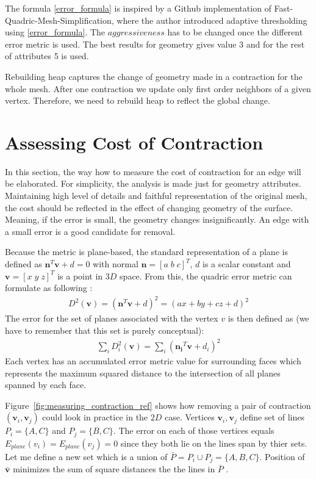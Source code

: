 The formula \ref{error_formula} is inspired by a Github implementation of Fast-Quadric-Mesh-Simplification, where the author introduced adaptive thresholding using \ref{error_formula}. The $aggressiveness$ has to be changed once the different error metric is used. The best results for geometry gives value 3 and for the rest of attributes 5 is used.

Rebuilding heap captures the change of geometry made in a contraction for the whole mesh. After one contraction we update only first order neighbors of a given vertex. Therefore, we need to rebuild heap to reflect the global change.

\section{Assessing Cost of Contraction}
In this section, the way how to measure the cost of contraction for an edge will be elaborated. For simplicity, the analysis is made just for geometry attributes. Maintaining high level of details and faithful representation of the original mesh, the cost should be reflected in the effect of changing geometry of the surface. Meaning, if the error is small, the geometry changes insignificantly. An edge with a small error is a good candidate for removal.

Because the metric is plane-based, the standard representation of a plane is defined as $\mathbf{n}^T\mathbf{v}+d=0$ with normal  $\mathbf{n} = [a\;b\;c]^T$, $d$ is a scalar constant and $\mathbf{v} = [x\;y\;z]^T$ is a point in $3D$ space. From this, the quadric error metric can formulate as following \cite{garland99}:
\begin{align}
D^2(\mathbf{v}) = (\mathbf{n}^T\mathbf{v}+d)^2 = (ax + by + cz + d)^2
\label{quadric_distance}
\end{align}
The error for the set of planes associated with the vertex $v$ is then defined as (we have to remember that this set is purely conceptual):
\begin{align}
\sum_{i} D_i^2(\mathbf{v}) = \sum_{i} (\mathbf{n_i}^T\mathbf{v}+d_i)^2
\end{align}
Each vertex has an accumulated error metric value for surrounding faces which represents the maximum squared distance to the intersection of all planes spanned by each face.

Figure~\ref{fig:measuring_contraction_ref} shows how removing a pair of contraction $(\mathbf{v}_i, \mathbf{v}_j)$ could look in practice in the $2D$ case. Vertices $\mathbf{v}_i, \mathbf{v}_j$ define set of lines $P_i = \{A,C\}$ and $P_j = \{B, C\}$. The error on each of those vertices equals $E_{plane}(v_i) = E_{plane}(v_j) = 0$ since they both lie on the lines span by thier sets. Let me define a new set which is a union of $ \bar{P} = P_i \cup P_j = \{ A,B,C \}$. Position of $\bar{\mathbf{v}}$ minimizes the sum of square distances the the lines in $\bar{P}$ \cite{garland99}.

